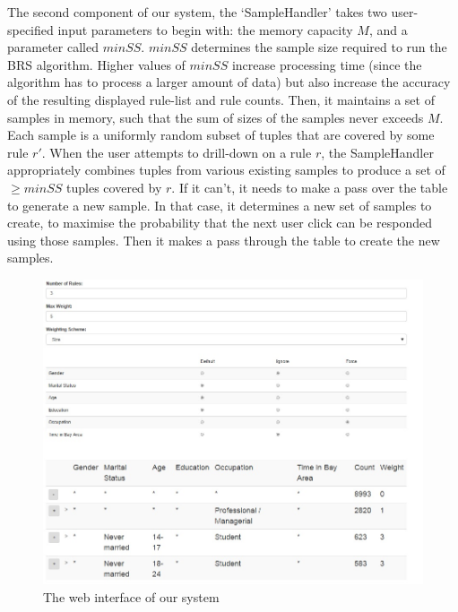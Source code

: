 The second component of our system, the `SampleHandler' takes two user-specified input parameters to begin with: the memory capacity $M$, and a parameter called $minSS$. $minSS$ determines the sample size required to run the BRS algorithm. Higher values of $minSS$ increase processing time (since the algorithm has to process a larger amount of data) but also increase the accuracy of the resulting displayed rule-list and rule counts. Then, it maintains a set of samples in memory, such that the sum of sizes of the samples never exceeds $M$. Each sample is a uniformly random subset of tuples that are covered by some rule $r'$. When the user attempts to drill-down on a rule $r$, the SampleHandler appropriately combines tuples from various existing samples to produce a set of $\geq minSS$ tuples covered by $r$. If it can't, it needs to make a pass over the table to generate a new sample. In that case, it determines a new set of samples to create, to maximise the probability that the next user click can be responded using those samples. Then it makes a pass through the table to create the new samples. 

\begin{figure}[ht]
\vspace{-5pt}
\centering
\includegraphics[width=160mm,frame]{graphs/tsapp_screenshot.jpg}
\vspace{-5pt}
\caption{The web interface of our system \label{fig:interface}}
\vspace{-5pt}
\end{figure}

